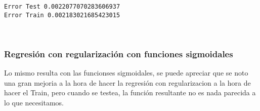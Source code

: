 \documentclass[11pt]{article}
\begin{document}
    \begin{Verbatim}[commandchars=\\\{\}]
Error Test 0.0022077070283606937
Error Train 0.002183021685423015

    \end{Verbatim}

    \begin{center}
    \end{center}
    { \hspace*{\fill} \\}
    
    \subsubsection{Regresión con regularización con funciones
sigmoidales}\label{regresiuxf3n-con-regularizaciuxf3n-con-funciones-sigmoidales}

    Lo mismo resulta con las funcionses sigmoidales, se puede apreciar que
se noto una gran mejoria a la hora de hacer la regresión con
regularizacion a la hora de hacer el Train, pero cuando se testea, la
función resultante no es nada parecida a lo que necesitamos.
\end{document}
